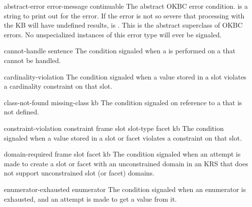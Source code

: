 

\begin{okbccondition}{abstract-error}{ error-message continuable } { }
The abstract OKBC error condition.  
   is a string to print out for the error.  If the error is not so severe that
   processing with the KB will have undefined results, 
   is \true.  This is the abstract superclass of OKBC errors.  No
   unspecialized instances of this error type will ever be signaled.
\end{okbccondition}

\begin{okbccondition}{cannot-handle}{ sentence } {  }
The condition signaled when a  is performed on
   a  that cannot be handled.
\end{okbccondition}

\begin{okbccondition}{cardinality-violation}{  } {  }
The condition signaled when a value stored in a slot violates a cardinality
    constraint on that slot.
\end{okbccondition}

\begin{okbccondition}{class-not-found}{ missing-class kb } {  }
The condition signaled on reference to a  that is not
    defined.
\end{okbccondition}

\begin{okbccondition}{constraint-violation}{ constraint frame slot slot-type facet kb } {  }
The condition signaled when a value stored in a slot or facet violates a 
    constraint on that slot.
\end{okbccondition}

\begin{okbccondition}{domain-required}{ frame slot facet kb } {  }
The condition signaled when an attempt is made to create
   a slot or facet with an unconstrained domain in an KRS that does not support
   unconstrained slot (or facet) domains.
\end{okbccondition}

\begin{okbccondition}{enumerator-exhausted}{ enumerator } {  }
The condition signaled when an enumerator is exhausted, 
   and an attempt is made to get a value from it.
\end{okbccondition}


